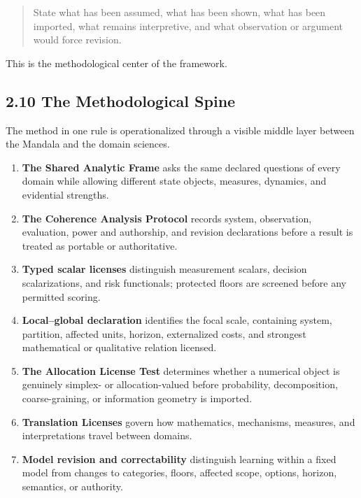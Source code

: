 \documentclass[
  11pt,
]{article}
\providecommand{\tightlist}{%
  \setlength{\itemsep}{0pt}\setlength{\parskip}{0pt}}
\begin{document}
\begin{quote}
State what has been assumed, what has been shown, what has been
imported, what remains interpretive, and what observation or argument
would force revision.
\end{quote}

This is the methodological center of the framework.

\subsection{2.10 The Methodological
Spine}\label{the-methodological-spine}

The method in one rule is operationalized through a visible middle layer
between the Mandala and the domain sciences.

\begin{enumerate}
\def\labelenumi{\arabic{enumi}.}
\tightlist
\item
  \textbf{The Shared Analytic Frame} asks the same declared questions of
  every domain while allowing different state objects, measures,
  dynamics, and evidential strengths.
\item
  \textbf{The Coherence Analysis Protocol} records system, observation,
  evaluation, power and authorship, and revision declarations before a
  result is treated as portable or authoritative.
\item
  \textbf{Typed scalar licenses} distinguish measurement scalars,
  decision scalarizations, and risk functionals; protected floors are
  screened before any permitted scoring.
\item
  \textbf{Local--global declaration} identifies the focal scale,
  containing system, partition, affected units, horizon, externalized
  costs, and strongest mathematical or qualitative relation licensed.
\item
  \textbf{The Allocation License Test} determines whether a numerical
  object is genuinely simplex- or allocation-valued before probability,
  decomposition, coarse-graining, or information geometry is imported.
\item
  \textbf{Translation Licenses} govern how mathematics, mechanisms,
  measures, and interpretations travel between domains.
\item
  \textbf{Model revision and correctability} distinguish learning within
  a fixed model from changes to categories, floors, affected scope,
  options, horizon, semantics, or authority.
\end{enumerate}
\end{document}
